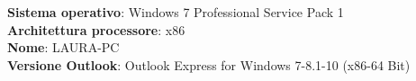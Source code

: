 \textbf{Sistema operativo}: Windows 7 Professional Service Pack 1\\
\textbf{Architettura processore}: x86\\
\textbf{Nome}: LAURA-PC\vspace{14pt}\\
\textbf{Versione Outlook}: Outlook Express for Windows 7-8.1-10 (x86-64 Bit)